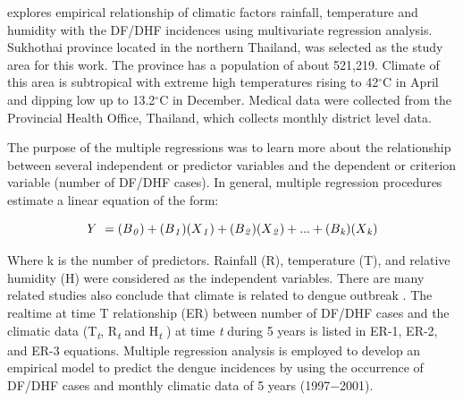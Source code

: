 \documentclass[review]{elsarticle}
\begin{document}
\cite{nakhapakorn2005information} explores empirical relationship of climatic factors rainfall, temperature and humidity with the DF/DHF incidences using multivariate regression analysis. Sukhothai province located in the northern Thailand, was selected as the study area for this work.  The province has a population of about 521,219. Climate of this area is subtropical with extreme high temperatures rising to 42$^{\circ}$C in April and dipping low up to 13.2$^{\circ}$C in December. Medical data were collected from the Provincial Health Office, Thailand, which collects monthly district level data.  

The purpose of the multiple regressions was to learn more about the relationship between several independent or predictor variables and the dependent or criterion variable (number of DF/DHF cases). 
In general, multiple regression procedures estimate a linear equation of the form:

\begin{equation}
\label{eq:linear}
Y\ =   (B\textsubscript{\textit{0}}) + (B\textsubscript{\textit{1}})(X\textsubscript{\textit{1}}) + (B\textsubscript{\textit{2}})(X\textsubscript{\textit{2}}) + ... + (B\textsubscript{\textit{k}})(X\textsubscript{\textit{k}}) 
\end{equation}

Where k is the number of predictors. Rainfall (R), temperature (T), and relative humidity (H) were considered as the independent variables. There are many related studies also conclude that climate is related to dengue outbreak \cite{li1985rainfall,hales2002potential,rueda1990temperature,tun2000effects,brady2013modelling}. The realtime at time T relationship (ER) between number of DF/DHF cases and the climatic data  (T\textsubscript{\textit{t}}, R\textsubscript{\textit{t}} and H\textsubscript{\textit{t}} ) at time \textit{t} during 5 years is listed in ER-1, ER-2, and ER-3 equations. Multiple regression analysis is employed to develop an empirical model to predict the dengue incidences by using the occurrence of DF/DHF cases and monthly climatic data of 5 years (1997$-$2001).
\end{document}
